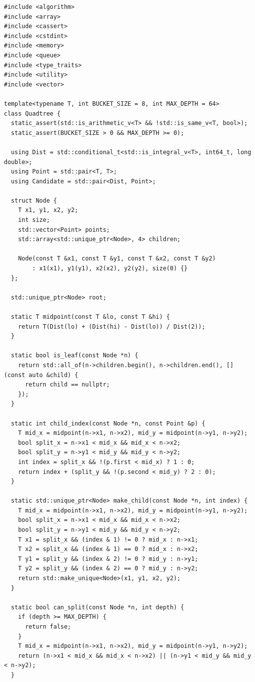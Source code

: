 \begin{lstlisting}[style=cpp]
#include <algorithm>
#include <array>
#include <cassert>
#include <cstdint>
#include <memory>
#include <queue>
#include <type_traits>
#include <utility>
#include <vector>

template<typename T, int BUCKET_SIZE = 8, int MAX_DEPTH = 64>
class Quadtree {
  static_assert(std::is_arithmetic_v<T> && !std::is_same_v<T, bool>);
  static_assert(BUCKET_SIZE > 0 && MAX_DEPTH >= 0);

  using Dist = std::conditional_t<std::is_integral_v<T>, int64_t, long double>;
  using Point = std::pair<T, T>;
  using Candidate = std::pair<Dist, Point>;

  struct Node {
    T x1, y1, x2, y2;
    int size;
    std::vector<Point> points;
    std::array<std::unique_ptr<Node>, 4> children;

    Node(const T &x1, const T &y1, const T &x2, const T &y2)
        : x1(x1), y1(y1), x2(x2), y2(y2), size(0) {}
  };

  std::unique_ptr<Node> root;

  static T midpoint(const T &lo, const T &hi) {
    return T(Dist(lo) + (Dist(hi) - Dist(lo)) / Dist(2));
  }

  static bool is_leaf(const Node *n) {
    return std::all_of(n->children.begin(), n->children.end(), [](const auto &child) {
      return child == nullptr;
    });
  }

  static int child_index(const Node *n, const Point &p) {
    T mid_x = midpoint(n->x1, n->x2), mid_y = midpoint(n->y1, n->y2);
    bool split_x = n->x1 < mid_x && mid_x < n->x2;
    bool split_y = n->y1 < mid_y && mid_y < n->y2;
    int index = split_x && !(p.first < mid_x) ? 1 : 0;
    return index + (split_y && !(p.second < mid_y) ? 2 : 0);
  }

  static std::unique_ptr<Node> make_child(const Node *n, int index) {
    T mid_x = midpoint(n->x1, n->x2), mid_y = midpoint(n->y1, n->y2);
    bool split_x = n->x1 < mid_x && mid_x < n->x2;
    bool split_y = n->y1 < mid_y && mid_y < n->y2;
    T x1 = split_x && (index & 1) != 0 ? mid_x : n->x1;
    T x2 = split_x && (index & 1) == 0 ? mid_x : n->x2;
    T y1 = split_y && (index & 2) != 0 ? mid_y : n->y1;
    T y2 = split_y && (index & 2) == 0 ? mid_y : n->y2;
    return std::make_unique<Node>(x1, y1, x2, y2);
  }

  static bool can_split(const Node *n, int depth) {
    if (depth >= MAX_DEPTH) {
      return false;
    }
    T mid_x = midpoint(n->x1, n->x2), mid_y = midpoint(n->y1, n->y2);
    return (n->x1 < mid_x && mid_x < n->x2) || (n->y1 < mid_y && mid_y < n->y2);
  }


\end{lstlisting}
